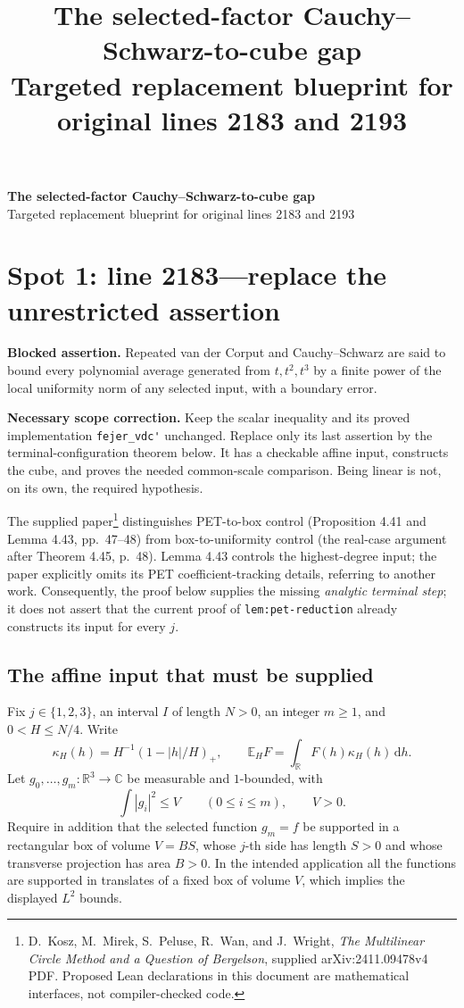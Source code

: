 \documentclass[11pt]{article}
\title{The selected-factor Cauchy--Schwarz-to-cube gap\\\large Targeted replacement blueprint for original lines 2183 and 2193}
\author{}\date{}
\newcommand{\R}{\mathbb R}
\newcommand{\C}{\mathbb C}
\newcommand{\E}{\mathbb E}
\newcommand{\dd}{\,\mathrm d}
\newcommand{\idname}[1]{\nolinkurl{#1}}
\theoremstyle{definition}\newtheorem{definition}[lemma]{Definition}
\begin{document}
\begin{center}{\Large\bfseries The selected-factor Cauchy--Schwarz-to-cube gap}\\[5pt]{\normalsize Targeted replacement blueprint for original lines 2183 and 2193}\end{center}\vspace{-0.5em}

\section*{Spot 1: line 2183---replace the unrestricted assertion}
\noindent\textbf{Blocked assertion.} Repeated van der Corput and Cauchy--Schwarz are said to bound every polynomial average generated from $t,t^2,t^3$ by a finite power of the local uniformity norm of any selected input, with a boundary error.

\noindent\textbf{Necessary scope correction.} Keep the scalar inequality and its proved implementation \idname{fejer_vdc'} unchanged. Replace only its last assertion by the terminal-configuration theorem below. It has a checkable affine input, constructs the cube, and proves the needed common-scale comparison. Being linear is not, on its own, the required hypothesis.

The supplied paper\footnote{D.~Kosz, M.~Mirek, S.~Peluse, R.~Wan, and J.~Wright, \emph{The Multilinear Circle Method and a Question of Bergelson}, supplied arXiv:2411.09478v4 PDF. Proposed Lean declarations in this document are mathematical interfaces, not compiler-checked code.} distinguishes PET-to-box control (Proposition 4.41 and Lemma 4.43, pp.~47--48) from box-to-uniformity control (the real-case argument after Theorem 4.45, p.~48). Lemma 4.43 controls the highest-degree input; the paper explicitly omits its PET coefficient-tracking details, referring to another work. Consequently, the proof below supplies the missing \emph{analytic terminal step}; it does not assert that the current proof of \idname{lem:pet-reduction} already constructs its input for every $j$.

\subsection*{The affine input that must be supplied}
Fix $j\in\{1,2,3\}$, an interval $I$ of length $N>0$, an integer $m\geq1$, and $0<H\leq N/4$. Write
\[
 \kappa_H(h)=H^{-1}(1-|h|/H)_+,
 \qquad \E_H F=\int_{\R}F(h)\kappa_H(h)\dd h.
\]
Let $g_0,\ldots,g_m:\R^3\to\C$ be measurable and $1$-bounded, with
\[
 \int |g_i|^2\leq V\qquad(0\leq i\leq m),\qquad V>0.
\]
Require in addition that the selected function $g_m=f$ be supported in a rectangular box of volume $V=BS$, whose $j$-th side has length $S>0$ and whose transverse projection has area $B>0$. In the intended application all the functions are supported in translates of a fixed box of volume $V$, which implies the displayed $L^2$ bounds.
\end{document}
